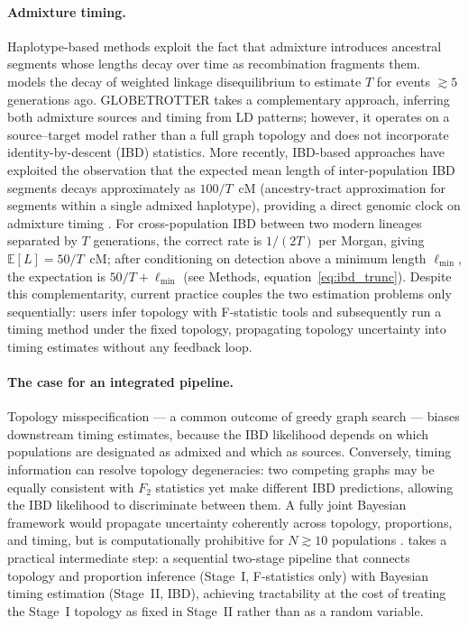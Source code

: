 \paragraph{Admixture timing.}
Haplotype-based methods exploit the fact that admixture introduces ancestral
segments whose lengths decay over time as recombination fragments them.
\alder{} \citep{Loh2013} models the decay of weighted linkage disequilibrium
to estimate $T$ for events $\gtrsim 5$ generations ago.
\textsc{GLOBETROTTER} \citep{Hellenthal2014} takes a complementary approach,
inferring both admixture sources and timing from LD patterns; however, it
operates on a source--target model rather than a full graph topology and does
not incorporate identity-by-descent (IBD) statistics.
More recently, IBD-based approaches have exploited the observation that the
expected mean length of inter-population IBD segments decays approximately
as $100/T$~cM (ancestry-tract approximation for segments within a single
admixed haplotype), providing a direct genomic clock on admixture timing
\citep{Browning2020,Palamara2012}.
For cross-population IBD between two modern lineages separated by $T$
generations, the correct rate is $1/(2T)$ per Morgan, giving
$\mathbb{E}[L] = 50/T$~cM; after conditioning on detection above a minimum
length $\ell_{\min}$, the expectation is $50/T + \ell_{\min}$
(see Methods, equation~\ref{eq:ibd_trunc}).
Despite this complementarity, current practice couples the two estimation
problems only sequentially: users infer topology with F-statistic tools and
subsequently run a timing method under the fixed topology, propagating
topology uncertainty into timing estimates without any feedback loop.

\paragraph{The case for an integrated pipeline.}
Topology misspecification — a common outcome of greedy graph search — biases
downstream timing estimates, because the IBD likelihood depends on which
populations are designated as admixed and which as sources.
Conversely, timing information can resolve topology degeneracies: two competing
graphs may be equally consistent with $F_2$ statistics yet make different IBD
predictions, allowing the IBD likelihood to discriminate between them.
A fully joint Bayesian framework would propagate uncertainty coherently across
topology, proportions, and timing, but is computationally prohibitive for
$N \gtrsim 10$ populations \citep{Nielsen2023}.
\hapgraph{} takes a practical intermediate step: a sequential two-stage
pipeline that connects topology and proportion inference (Stage~I,
F-statistics only) with Bayesian timing estimation (Stage~II, IBD),
achieving tractability at the cost of treating the Stage~I topology as fixed
in Stage~II rather than as a random variable.


